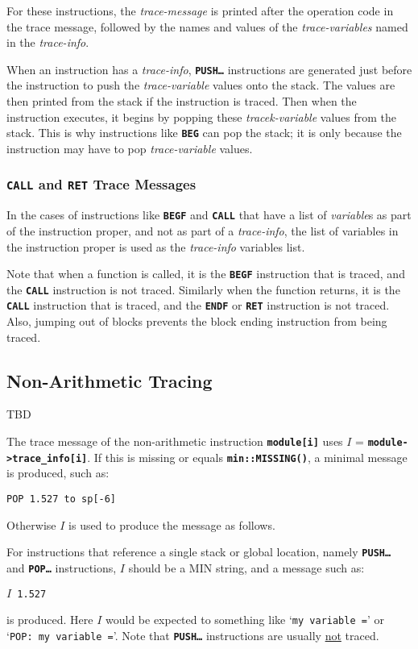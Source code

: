 \documentclass[12pt]{article}
\newcommand{\TT}[1]{{\tt \bfseries #1}}
\newcommand{\EOL}{\penalty \exhyphenpenalty}
\begin{document}
For these instructions, the {\em trace-message} is printed
after the operation code in the trace message, followed by
the names and values of the {\em trace-variables} named in the
{\em trace-info}.

When an instruction has a {\em trace-info}, \TT{PUSH\ldots}
instructions are generated just before the instruction to
push the {\em trace-variable} values onto the stack.  The values are then
printed from the stack if the instruction is traced.  Then
when the instruction executes, it begins by popping these
{\em tracek-variable} values from the stack.  This is why instructions
like \TT{BEG} can pop the stack; it is only because the
instruction may have to pop {\em trace-variable} values.

\subsubsection{\TT{CALL} and \TT{RET} Trace Messages}
\label{CALL-AND-RET-TRACE-MESSAGES}

In the cases of instructions
like \TT{BEGF} and \TT{CALL} that have a list of {\em variable}s
as part of the instruction proper, and not as part of a
{\em trace-info}, the list of variables in the instruction proper
is used as the {\em trace-info} variables list.


Note that when a function is called, it is the \TT{BEGF}
instruction that is traced, and the \TT{CALL} instruction
is not traced.  Similarly when the function returns,
it is the \TT{CALL} instruction that is traced, and the
\TT{ENDF} or \TT{RET} instruction is not traced.  Also,
jumping out of blocks prevents the block ending instruction
from being traced.


\subsection{Non-Arithmetic Tracing}
\label{NON-ARITHMETIC-TRACING}

TBD

The trace message of the non-arithmetic instruction
\TT{module[i]} uses
$I$ = \TT{module->\EOL trace\_\EOL info[i]}.  If this is missing
or equals \TT{min::MISSING()}, a minimal message
is produced, such as:
\begin{center}
\tt POP 1.527 to sp[-6]
\end{center}
Otherwise $I$ is used to produce the message as follows.

For instructions that reference a single stack or global location,
namely \TT{PUSH\ldots} and \TT{POP\ldots} instructions,
$I$ should be a MIN string, and a message such
as:
\begin{center}
\tt $I$ 1.527
\end{center}
is produced.  Here $I$ would be expected to something
like `{\tt my variable =}' or `{\tt POP: my variable =}'.
Note that \TT{PUSH\ldots} instructions are usually
\underline{not} traced.
\end{document}
